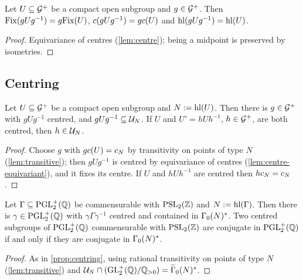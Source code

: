 \begin{lemma}\label{lem:centre-equivariant}
Let $U \subseteq \mathcal{G}^{+}$ be a compact open subgroup and
$g \in \mathcal{G}^{+}$. Then $\mathrm{Fix}(gUg^{-1}) = g\mathrm{Fix}(U)$,
$c(gUg^{-1}) = gc(U)$ and $\operatorname{hl}(gUg^{-1}) =
\operatorname{hl}(U)$.
\end{lemma}

\begin{proof}
Equivariance of centres (\cref{lem:centre}); being a midpoint is preserved
by isometries.
\end{proof}

\subsection{Centring}

\begin{proposition}[Centring]\label{prop:centring}
Let $U \subseteq \mathcal{G}^{+}$ be a compact open subgroup and
$N := \operatorname{hl}(U)$. Then there is $g \in \mathcal{G}^{+}$ with
$gUg^{-1}$ centred, and $gUg^{-1} \subseteq \mathcal{U}_{N}$. If $U$ and
$U' = hUh^{-1}$, $h \in \mathcal{G}^{+}$, are both centred, then
$h \in \mathcal{U}_{N}$.
\end{proposition}

\begin{proof}
Choose $g$ with $gc(U) = c_{N}$ by transitivity on points of
type $N$ (\cref{lem:transitive}); then $gUg^{-1}$ is centred by
equivariance of centres (\cref{lem:centre-equivariant}), and it fixes its
centre. If $U$ and $hUh^{-1}$ are centred then $hc_{N} =
c_{N}$.
\end{proof}

\begin{corollary}\label{cor:classical-centring}
Let $\Gamma \subseteq \mathrm{PGL}_{2}^{+}(\mathbb{Q})$ be commensurable with
$\PSL{2}{\ZZ}$ and $N := \operatorname{hl}(\Gamma)$. Then there is
$\gamma \in \mathrm{PGL}_{2}^{+}(\mathbb{Q})$ with $\gamma\Gamma\gamma^{-1}$ centred and
contained in $\GammaZeroStar{N}$. Two centred subgroups of
$\mathrm{PGL}_{2}^{+}(\mathbb{Q})$ commensurable with $\PSL{2}{\ZZ}$ are conjugate in
$\mathrm{PGL}_{2}^{+}(\mathbb{Q})$ if and only if they are conjugate in
$\GammaZeroStar{N}$.
\end{corollary}

\begin{proof}
As in \cref{prop:centring}, using rational transitivity on points of type
$N$ (\cref{lem:transitive}) and $\MaxCompact{N} \cap (\RationalLiftGroup) =
\GammaZeroStar[lift]{N}$.
\end{proof}

